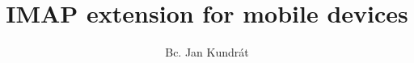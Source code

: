 \documentclass{book}
\begin{document}
\title{IMAP extension for mobile devices}

\author{Bc. Jan Kundrát}

\begin{titlepage}
\maketitle
\end{titlepage}


\listoftodos

\setcounter{tocdepth}{3}
\tableofcontents












\appendix






\end{document}
